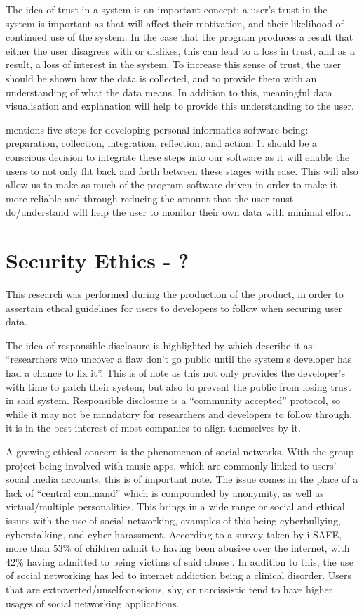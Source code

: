 \documentclass[11pt]{report}
\begin{document}
The idea of trust in a system is an important concept; a user’s trust in the system is important as that will affect their motivation, and their likelihood of continued use of the system. In the case that the program produces a result that either the user disagrees with or dislikes, this can lead to a loss in trust, and as a result, a loss of interest in the system. To increase this sense of trust, the user should be shown how the data is collected, and to provide them with an understanding of what the data means. In addition to this, meaningful data visualisation and explanation will help to provide this understanding to the user. \cite{Jaimes2013}

\cite{Li2010} mentions five steps for developing personal informatics software being: preparation, collection, integration, reflection, and action.  It should be a conscious decision to integrate these steps into our software as it will enable the users to not only flit back and forth between these stages with ease. This will also allow us to make as much of the program software driven in order to make it more reliable and through reducing the amount that the user must do/understand will help the user to monitor their own data with minimal effort.

\section{Security Ethics - ?}

This research was performed during the production of the product, in order to assertain ethcal guidelines for users to developers to follow when securing user data.\newline

The idea of responsible disclosure is highlighted by \cite{2010a} which describe it as: “researchers who uncover a flaw don't go public until the system's developer has had a chance to fix it”.  This is of note as this not only provides the developer’s with time to patch their system, but also to prevent the public from losing trust in said system.  Responsible disclosure is a “community accepted” protocol, so while it may not be mandatory for researchers and developers to follow through, it is in the best interest of most companies to align themselves by it.

A growing ethical concern is the phenomenon of social networks.  With the group project being involved with music apps, which are commonly linked to users’ social media accounts, this is of important note.  The issue comes in the place of a lack of “central command” which is compounded by anonymity, as well as virtual/multiple personalities.  This brings in a wide range or social and ethical issues with the use of social networking, examples of this being cyberbullying, cyberstalking, and cyber-harassment.  According to a survey taken by i-SAFE, more than 53\% of children admit to having been abusive over the internet, with 42\% having admitted to being victims of said abuse \cite{iSAFE2004}. In addition to this, the use of social networking has led to internet addiction being a clinical disorder.  Users that are extroverted/unselfconscious, shy, or narcissistic \cite{Kizza2016} tend to have higher usages of social networking applications.  
\end{document}
